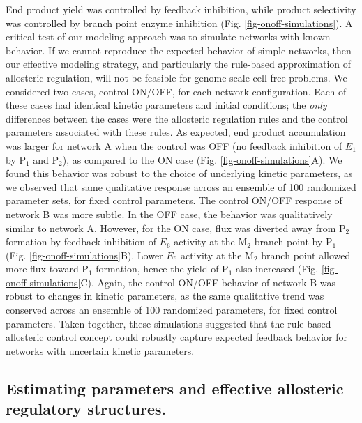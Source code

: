 \documentclass[processes,article,accept,moreauthors,pdftex,12pt,a4paper]{mdpi}
\begin{document}
End product yield was controlled by feedback inhibition, while product selectivity was controlled by branch point enzyme inhibition (Fig. \ref{fig-onoff-simulations}). 
A critical test of our modeling approach was to simulate networks with known behavior. 
If we cannot reproduce the expected behavior of simple networks, then our effective modeling strategy, and particularly the rule-based approximation of allosteric regulation, will not be feasible for genome-scale cell-free problems. We considered two cases, control ON/OFF, for each network configuration. 
Each of these cases had identical kinetic parameters and initial conditions; the \textit{only} differences between the cases were the allosteric regulation rules and the control parameters associated with these rules. 
As expected, end product accumulation was larger for network A when the control was OFF (no feedback inhibition of $E_{1}$ by P$_{1}$ and P$_{2}$),
as compared to the ON case (Fig. \ref{fig-onoff-simulations}A). 
We found this behavior was robust to the choice of underlying kinetic parameters, as we observed that same qualitative response across an ensemble of 100 randomized parameter sets, for fixed control parameters. 
The control ON/OFF response of network B was more subtle. 
In the OFF case, the behavior was qualitatively similar to network A. 
However, for the ON case, flux was diverted away from P$_{2}$ formation by feedback inhibition of $E_{6}$ activity at the M$_{2}$ branch point by P$_{1}$ (Fig. \ref{fig-onoff-simulations}B). 
Lower $E_{6}$ activity at the M$_{2}$ branch point allowed more flux toward P$_{1}$ formation, hence the yield of P$_{1}$ also increased (Fig. \ref{fig-onoff-simulations}C). 
Again, the control ON/OFF behavior of network B was robust to changes in kinetic parameters, as the same qualitative trend was conserved across an ensemble of 100 randomized parameters, for fixed control parameters. 
Taken together, these simulations suggested that the rule-based allosteric control concept could robustly capture expected feedback behavior for networks with uncertain kinetic parameters.

\subsection{Estimating parameters and effective allosteric regulatory structures.}
\end{document}
